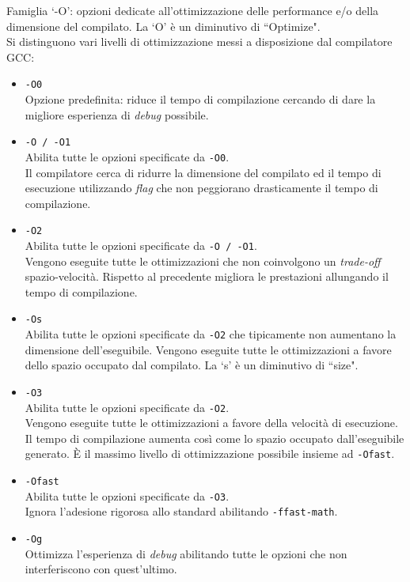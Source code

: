Famiglia `-O': opzioni dedicate all'ottimizzazione delle performance e/o della 
dimensione del compilato. La `O' è un diminutivo di ``Optimize".\\
Si distinguono vari livelli di ottimizzazione messi a disposizione dal 
compilatore GCC:
\begin{itemize}
\item \verb|-O0|\\
Opzione predefinita: riduce il tempo di compilazione cercando di dare la 
migliore esperienza di \emph{debug} possibile.
\item \verb|-O / -O1|\\
Abilita tutte le opzioni specificate da \verb|-O0|.\\
Il compilatore cerca di ridurre la dimensione del compilato ed il tempo di 
esecuzione utilizzando \emph{flag} che non peggiorano drasticamente il tempo 
di compilazione.
\item \verb|-O2|\\
Abilita tutte le opzioni specificate da \verb|-O / -O1|.\\
Vengono eseguite tutte le ottimizzazioni che non coinvolgono un 
\emph{trade-off} spazio-velocità. Rispetto al precedente migliora le 
prestazioni allungando il tempo di compilazione.
\item \verb|-Os|\\
Abilita tutte le opzioni specificate da \verb|-O2| che tipicamente non 
aumentano la dimensione dell'eseguibile. Vengono eseguite tutte le 
ottimizzazioni a favore dello spazio occupato dal compilato. La `s' è un 
diminutivo di ``size".
\item \verb|-O3|\\
Abilita tutte le opzioni specificate da \verb|-O2|.\\
Vengono eseguite tutte le ottimizzazioni a favore della velocità di esecuzione. 
Il tempo di compilazione aumenta così come lo spazio occupato dall'eseguibile 
generato. \`E il massimo livello di ottimizzazione possibile insieme ad 
\verb|-Ofast|.
\item \verb|-Ofast|\\
Abilita tutte le opzioni specificate da \verb|-O3|.\\
Ignora l'adesione rigorosa allo standard abilitando \verb|-ffast-math|.
\item \verb|-Og|\\
Ottimizza l'esperienza di \emph{debug} abilitando tutte le opzioni che non 
interferiscono con quest'ultimo.
\end{itemize}

